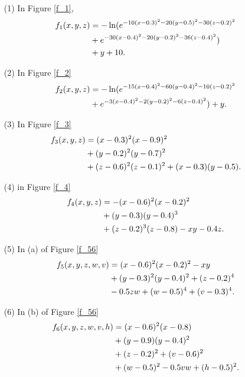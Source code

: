 \begin{itemize}
\item[(1)]In Figure \eqref{f_1}, 
\begin{align}
    f_1(x,y,z) &= -\ln (e^{ -10 (x - 0.3)^2 - 20(y - 0.5)^2 - 30(z - 0.2)^2 }\notag \\
    &+e^{ -30 (x - 0.4)^2 - 20(y - 0.2)^2 - 36(z - 0.4)^2 } )\notag\\ &+ y + 10.
\end{align}
\item[(2)]In Figure \eqref{f_2} 
\begin{align}
f_2(x,y,z) &= -\ln (e^{ -15 (x - 0.4)^2 - 60(y - 0.4)^2 - 10(z - 0.2)^2 }\notag\\
& +e^{ -3 (x - 0.4)^2 - 2(y - 0.2)^2 - 6(z - 0.4)^2 } ) + y.
\end{align}

\item[(3)]In Figure \eqref{f_3} 
\begin{align}
f_3(x,y,z) &= (x - 0.3)^2 (x - 0.9)^2 \notag\\ 
&+ (y - 0.2)^2(y - 0.7)^2\notag\\ 
&+ (z - 0.6)^2(z - 0.1)^2 + (x - 0.3)(y - 0.5)   .
\end{align}

\item[(4)] in Figure \eqref{f_4} 
\begin{align}
f_4(x,y,z) &= -(x - 0.6)^2 (x - 0.2)^2 \notag\\
&+ (y - 0.3)(y - 0.4)^3\notag\\ 
&+ (z - 0.2)^3(z - 0.8) - xy - 0.4z  .
\end{align}

\item[(5)]In (a) of Figure \eqref{f_56} 
\begin{align}
f_5(x,y,z,w,v) &= (x - 0.6)^2 (x - 0.2)^2 - xy  \notag\\
&+ (y - 0.3)^2(y - 0.4)^2 + (z - 0.2)^4
\notag\\
&- 0.5zw + (w - 0.5)^4 + (v - 0.3)^4   .
\end{align}

\item[(6)]In (b) of Figure \eqref{f_56} 
\begin{align}
f_6(x,y,z,w,v,h) &= (x - 0.6)^2 (x - 0.8)  \notag\\
&+ (y - 0.9)(y - 0.4)^2 \notag\\
&+ (z - 0.2)^2 + (v - 0.6)^2 
\notag\\
&+ (w - 0.5)^2 - 0.5vw + (h - 0.5)^2  .
\end{align}
\end{itemize}

